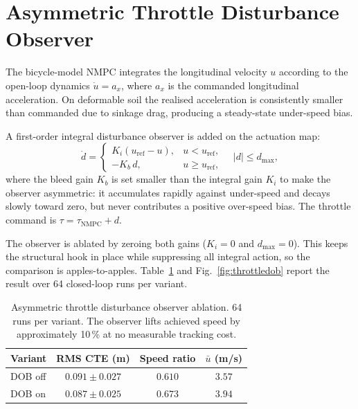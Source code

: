 \documentclass[conference,letterpaper,10pt]{IEEEtran}
\begin{document}
\section{Asymmetric Throttle Disturbance Observer}
\label{sec:throttledob}

The bicycle-model NMPC integrates the longitudinal velocity $u$
according to the open-loop dynamics $\dot u = a_x$, where $a_x$ is
the commanded longitudinal acceleration. On deformable soil the
realised acceleration is consistently smaller than commanded due to
sinkage drag, producing a steady-state under-speed bias.

A first-order integral disturbance observer is added on the
actuation map:
\begin{equation}
  \dot d = \begin{cases}
    K_i (u_{\mathrm{ref}} - u), & u < u_{\mathrm{ref}},\\
    -K_b\, d,                   & u \ge u_{\mathrm{ref}},
  \end{cases}
  \quad |d| \le d_{\max},
\end{equation}
where the bleed gain $K_b$ is set smaller than the integral gain
$K_i$ to make the observer asymmetric: it accumulates rapidly
against under-speed and decays slowly toward zero, but never
contributes a positive over-speed bias. The throttle command is
$\tau = \tau_{\mathrm{NMPC}} + d$.

The observer is ablated by zeroing both gains
($K_i = 0$ and $d_{\max} = 0$). This keeps the structural hook in
place while suppressing all integral action, so the comparison is
apples-to-apples. Table~\ref{tab:throttledob} and
Fig.~\ref{fig:throttledob} report the result over 64 closed-loop
runs per variant.

\begin{table}[!t]
  \renewcommand{\arraystretch}{1.15}
  \caption{Asymmetric throttle disturbance observer ablation.
    64 runs per variant. The observer lifts achieved speed by
    approximately 10\,\% at no measurable tracking cost.}
  \label{tab:throttledob}
  \centering
  \begin{tabular}{lccc}
    \toprule
    \textbf{Variant} & \textbf{RMS CTE (m)} & \textbf{Speed ratio} & \textbf{$\bar u$ (m/s)}\\
    \midrule
    DOB off & $0.091 \pm 0.027$ & $0.610$ & $3.57$\\
    DOB on  & $0.087 \pm 0.025$ & $\mathbf{0.673}$ & $\mathbf{3.94}$\\
    \bottomrule
  \end{tabular}
\end{table}
\end{document}
